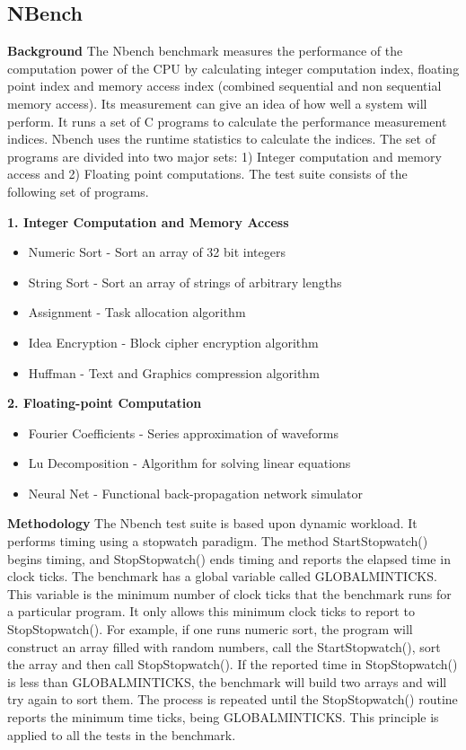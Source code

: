 \documentclass{IEEEtran}
\begin{document}
\subsection{NBench}\label{sub:nbench}
\textbf{Background}
The Nbench benchmark measures the performance of the computation power of the CPU by calculating integer computation index, floating point index and memory access 
index (combined sequential and non sequential memory access). Its measurement can give an idea of how well a system will perform. It runs a set of C programs to calculate the performance measurement indices. Nbench uses the runtime statistics to calculate the indices. The set of programs are divided into two major sets: 1) Integer computation and memory access and 2) Floating point computations. The test suite consists of the following set of programs.

\textbf{1. Integer Computation and Memory Access}
\begin{itemize}
\item Numeric Sort - Sort an array of 32 bit integers
\item String  Sort - Sort an array of strings of arbitrary lengths
\item Assignment - Task allocation algorithm
\item Idea Encryption - Block cipher encryption algorithm  
\item Huffman - Text and Graphics compression algorithm 
\end{itemize}
\textbf{2. Floating-point Computation}
\begin{itemize}
\item Fourier Coefficients - Series approximation of waveforms 
\item Lu Decomposition - Algorithm for solving linear equations  
\item Neural Net - Functional back-propagation network simulator
\end{itemize}

\textbf{Methodology}
The Nbench test suite is based upon dynamic workload. It performs timing using a stopwatch paradigm. The method StartStopwatch() begins timing, and StopStopwatch() ends timing and reports the elapsed time in clock ticks. The benchmark has a global variable called GLOBALMINTICKS. This variable is the minimum number of clock ticks that the benchmark runs for a particular program. It only allows this minimum clock ticks to report to StopStopwatch(). For example, if one runs numeric sort, the program will construct an array filled with random numbers, call the StartStopwatch(), sort the array and then call StopStopwatch(). If the reported time in StopStopwatch() is less than GLOBALMINTICKS, the benchmark will build two arrays and will try again to sort them. The process is repeated until the StopStopwatch() routine reports the minimum time ticks, being GLOBALMINTICKS. This principle is applied to all the tests in the benchmark.\cite{TUX}
\end{document}
